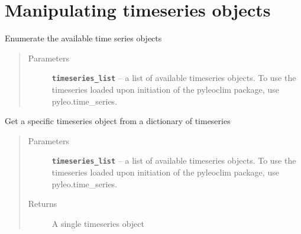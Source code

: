 \documentclass[letterpaper,10pt,english]{sphinxmanual}
\begin{document}
\section{Manipulating timeseries objects}
\label{LIPDutils:manipulating-timeseries-objects}

\begin{fulllineitems}
\label{LIPDutils:pyleoclim.enumerateTSO}
Enumerate the available time series objects
\begin{quote}\begin{description}
\item[{Parameters}] \leavevmode
\textbf{\texttt{timeseries\_list}} -- a  list of available timeseries objects.
To use the timeseries loaded upon initiation of the
pyleoclim package, use pyleo.time\_series.

\end{description}\end{quote}

\end{fulllineitems}


\begin{fulllineitems}
\label{LIPDutils:pyleoclim.getTSO}
Get a specific timeseries object from a dictionary of timeseries
\begin{quote}\begin{description}
\item[{Parameters}] \leavevmode
\textbf{\texttt{timeseries\_list}} -- a  list of available timeseries objects.
To use the timeseries loaded upon initiation of the
pyleoclim package, use pyleo.time\_series.

\item[{Returns}] \leavevmode
A single timeseries object

\end{description}\end{quote}

\end{fulllineitems}

\end{document}
